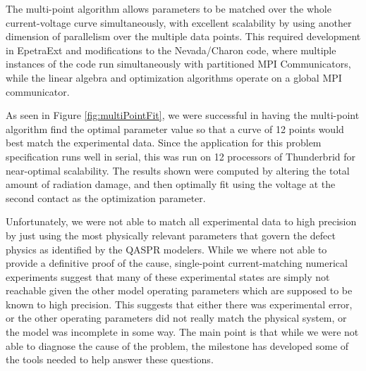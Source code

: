 \documentclass[pdf,ps2pdf,11pt]{SANDreport}
\begin{document}


The multi-point algorithm allows parameters to be matched over the whole
current-voltage curve simultaneously, with excellent scalability by using
another dimension of parallelism over the multiple data points.  This required
development in EpetraExt and modifications to the Nevada/Charon code, where
multiple instances of the code run simultaneously with partitioned MPI
Communicators, while the linear algebra and optimization algorithms operate on
a global MPI communicator.




As seen in Figure {}\ref{fig:multiPointFit}, we were successful in having the
multi-point algorithm find the optimal parameter value so that a curve of 12
points would best match the experimental data. Since the application for this
problem specification runs well in serial, this was run on 12 processors of
Thunderbrid for near-optimal scalability.  The results shown were computed by
altering the total amount of radiation damage, and then optimally fit using
the voltage at the second contact as the optimization parameter.

Unfortunately, we were not able to match all experimental data to high
precision by just using the most physically relevant parameters that govern
the defect physics as identified by the QASPR modelers.  While we where not
able to provide a definitive proof of the cause, single-point current-matching
numerical experiments suggest that many of these experimental states are
simply not reachable given the other model operating parameters which are
supposed to be known to high precision.  This suggests that either there was
experimental error, or the other operating parameters did not really match the
physical system, or the model was incomplete in some way.  The main point is
that while we were not able to diagnose the cause of the problem, the
milestone has developed some of the tools needed to help answer these
questions.
\end{document}
